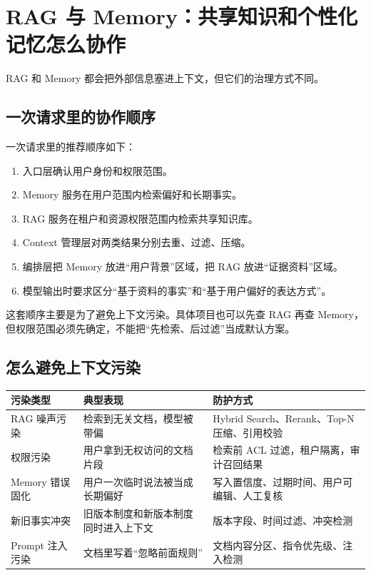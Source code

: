 \documentclass[10pt,a4paper]{ctexart}
\begin{document}
\section{RAG 与 Memory：共享知识和个性化记忆怎么协作}


RAG 和 Memory 都会把外部信息塞进上下文，但它们的治理方式不同。



\subsection{一次请求里的协作顺序}


一次请求里的推荐顺序如下：


\begin{enumerate}[itemsep=2pt, topsep=4pt]
  \item 入口层确认用户身份和权限范围。
  \item Memory 服务在用户范围内检索偏好和长期事实。
  \item RAG 服务在租户和资源权限范围内检索共享知识库。
  \item Context 管理层对两类结果分别去重、过滤、压缩。
  \item 编排层把 Memory 放进“用户背景”区域，把 RAG 放进“证据资料”区域。
  \item 模型输出时要求区分“基于资料的事实”和“基于用户偏好的表达方式”。
\end{enumerate}


这套顺序主要是为了避免上下文污染。具体项目也可以先查 RAG 再查 Memory，但权限范围必须先确定，不能把“先检索、后过滤”当成默认方案。



\subsection{怎么避免上下文污染}

{\footnotesize
\begin{tabularx}{\textwidth}{|X|X|X|}
\hline
\textbf{污染类型} & \textbf{典型表现} & \textbf{防护方式} \\
\hline
RAG 噪声污染 & 检索到无关文档，模型被带偏 & Hybrid Search、Rerank、Top-N 压缩、引用校验 \\
\hline
权限污染 & 用户拿到无权访问的文档片段 & 检索前 ACL 过滤，租户隔离，审计召回结果 \\
\hline
Memory 错误固化 & 用户一次临时说法被当成长期偏好 & 写入置信度、过期时间、用户可编辑、人工复核 \\
\hline
新旧事实冲突 & 旧版本制度和新版本制度同时进入上下文 & 版本字段、时间过滤、冲突检测 \\
\hline
Prompt 注入污染 & 文档里写着“忽略前面规则” & 文档内容分区、指令优先级、注入检测 \\
\hline
\end{tabularx}
}
\end{document}
